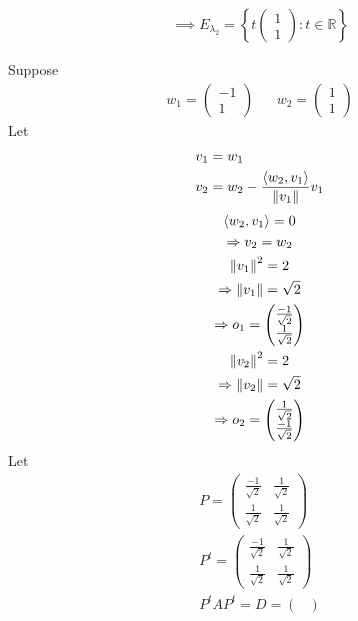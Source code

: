 \begin{enumerate}
\begin{itemize}
\begin{gather}
\implies E_{\lambda_2} = \left\{
t\begin{pmatrix}1\\1\end{pmatrix} \colon t \in \mathbb{R}
\right\}
\end{gather}
\end{itemize}
Suppose
\begin{align}
w_1 = \begin{pmatrix}-1\\1\end{pmatrix} & & w_2 = \begin{pmatrix}1\\1\end{pmatrix}
\end{align}
Let
\begin{align}
v_1 &= w_1\\
v_2 &= w_2 - \frac{\langle w_2,v_1\rangle}{\left\lVert v_1\right\rVert}v_1
\end{align}
\begin{gather}
\langle w_2,v_1 \rangle = 0\\
\Rightarrow v_2 = w_2\\
\left\lVert v_1\right\rVert^2  = 2\\
\Rightarrow \left\lVert v_1\right\rVert = \sqrt{2}\\
\Rightarrow o_1
= \begin{pmatrix}\frac{-1}{\sqrt{2}}\\\frac{1}{\sqrt{2}}\end{pmatrix}\\
\left\lVert v_2\right\rVert^2 = 2\\
\Rightarrow \left\lVert v_2\right\rVert = \sqrt{2}\\
\Rightarrow o_2 = \begin{pmatrix}\frac{1}{\sqrt{2}}\\\frac{-1}{\sqrt{2}}\end{pmatrix}
\end{gather}
Let 
\begin{gather}
P = \begin{pmatrix}
\frac{-1}{\sqrt{2}} & \frac{1}{\sqrt{2}}\\
\frac{1}{\sqrt{2}} & \frac{1}{\sqrt{2}}
\end{pmatrix}\\
P^t = \begin{pmatrix}
\frac{-1}{\sqrt{2}} & \frac{1}{\sqrt{2}}\\
\frac{1}{\sqrt{2}} & \frac{1}{\sqrt{2}}
\end{pmatrix}\\
P^tAP^t = D = \begin{pmatrix}

\end{pmatrix}
\end{gather}
\end{enumerate}
